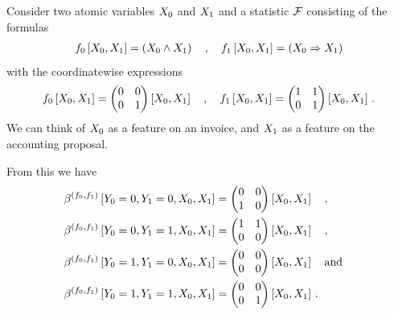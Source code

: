 \begin{example}\label{exa:nonelHlnstat}

    Consider two atomic variables $X_{0}$ and $X_{1}$ and a statistic $\mathcal{F}$ consisting of the formulas
    \begin{align*}
        f_{0}\left[X_{0},X_{1}\right] = \left( X_{0} \land X_{1} \right) \quad, \quad
        f_{1}\left[X_{0},X_{1}\right] = \left( X_{0} \Rightarrow X_{1} \right)
    \end{align*}
    with the coordinatewise expressions
    \begin{align*}
        f_{0}\left[X_{0},X_{1}\right] =
        \begin{pmatrix} 
            0 & 0 \\
            0 & 1
         \end{pmatrix}\left[X_{0},X_{1}\right]
        \quad, \quad
        f_{1}\left[X_{0},X_{1}\right] =
        \begin{pmatrix} 
            1 & 1 \\
            0 & 1
         \end{pmatrix}\left[X_{0},X_{1}\right] \, .
    \end{align*}
    We can think of $X_{0}$ as a feature on an invoice, and $X_{1}$ as a feature on the accounting proposal.

    From this we have
    \begin{align*}
        \bencodingofat{(\formulaof{0},\formulaof{1})}{\headvariableof{0}=0,\headvariableof{1}=0,\catvariableof{0},\catvariableof{1}} &=
        \coloredmatrixof{
            0 & 0 \\
            1 & 0
        }{\catvariableof{0},\catvariableof{1}} \quad, \quad \\
       \bencodingofat{(\formulaof{0},\formulaof{1})}{\headvariableof{0}=0,\headvariableof{1}=1,\catvariableof{0},\catvariableof{1}} &=
        \coloredmatrixof{
            1 & 1 \\
            0 & 0
        }{\catvariableof{0},\catvariableof{1}} \quad, \quad \\
        \bencodingofat{(\formulaof{0},\formulaof{1})}{\headvariableof{0}=1,\headvariableof{1}=0,\catvariableof{0},\catvariableof{1}} &=
        \coloredmatrixof{
            0 & 0 \\
            0 & 0
        }{\catvariableof{0},\catvariableof{1}} \quad \text{and} \quad \\
        \bencodingofat{(\formulaof{0},\formulaof{1})}{\headvariableof{0}=1,\headvariableof{1}=1,\catvariableof{0},\catvariableof{1}} &=
        \coloredmatrixof{
            0 & 0 \\
            0 & 1
        }{\catvariableof{0},\catvariableof{1}} \, .
    \end{align*}


\end{example}
